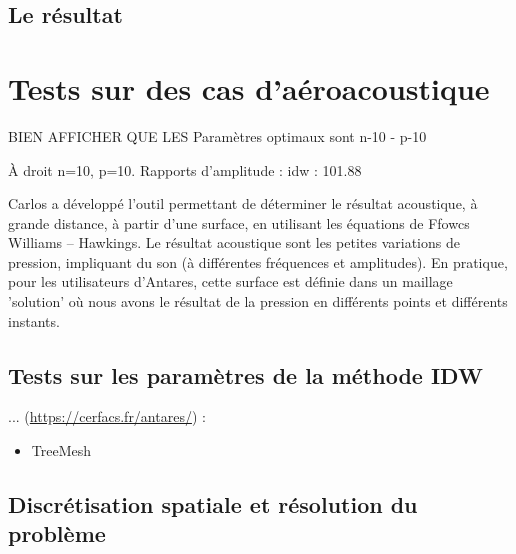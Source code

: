 \subsection{Le résultat}





\section{Tests sur des cas d'aéroacoustique}


BIEN AFFICHER QUE LES Paramètres optimaux sont n-10 - p-10

À droit n=10, p=10. Rapports d'amplitude : idw : 101.88 %

Carlos a développé l'outil permettant de déterminer le résultat acoustique, à grande distance, à partir d'une surface, en utilisant les équations de Ffowcs Williams – Hawkings. Le résultat acoustique sont les petites variations de pression, impliquant du son (à différentes fréquences et amplitudes). En pratique, pour les utilisateurs d'Antares, cette surface est définie dans un maillage 'solution' où nous avons le résultat de la pression en différents points et différents instants.
\subsection{Tests sur les paramètres de la méthode IDW}




... (\url{https://cerfacs.fr/antares/}) : 


\begin{itemize}
    \item TreeMesh 
\end{itemize}


\subsection{Discrétisation spatiale et résolution du problème}